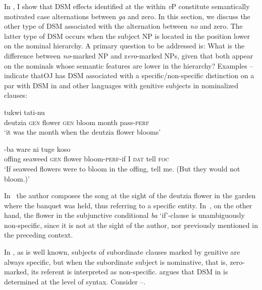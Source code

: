 \documentclass[output=paper]{LSP/langsci}
\begin{document}
In , I show that DSM effects identified at the  within \textit{v}P constitute semantically motivated case alternations between \textit{ga} and zero. In this section, we discuss the other type of DSM associated with the alternation between \textit{no} and zero. The latter type of DSM occurs when the subject NP is located in the position lower on the nominal hierarchy. A primary question to be addressed is: What is the difference between \textit{no}{}-marked NP and z\textit{ero}-marked NPs, given that both appear on the nominals whose semantic features are lower in the hierarchy? Examples -- indicate thatOJ  has DSM associated with a specific/non-specific distinction on a par with DSM in  and other languages with genitive subjects in nominalized clauses:

\begin{exe}
\ex%
\label{14-ya-ex:20}
\begin{xlist}
\ex
\label{14-ya-ex:20a}
 tukwi tati-nu\\ %
deutzia \textsc{gen} flower \textsc{gen} bloom month pass-\textsc{perf}\\
\glt ‘it was the month when the deutzia flower blooms’

\ex
\label{14-ya-ex:20b}
-ba ware ni tuge koso\\
offing seaweed \textsc{gen} flower {} bloom-\textsc{perf}-if I \textsc{dat} tell \textsc{foc}\\
\glt ‘If seaweed flowers were to bloom in the offing, tell me. (But they would not bloom.)’
\end{xlist}
\end{exe}

In~ the author composes the song at the sight of the deutzia flower in the garden where the banquet was held, thus referring to a specific entity. In~, on the other hand, the flower in the subjunctive conditional \textit{ba} ‘if’-clause is unambiguously non-specific, since it is not at the sight of the author, nor previously mentioned in the preceding context. 

In , as is well known, subjects of subordinate clauses marked by genitive are always specific, but when the subordinate subject is nominative, that is, zero-marked, its referent is interpreted as non-specific. \citet{Woolford2008Differential} argues that DSM in  is determined at the level of syntax. Consider --.
\end{document}
